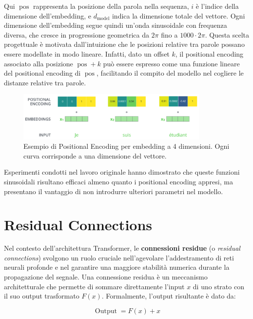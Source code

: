 Qui $\operatorname{pos}$ rappresenta la posizione della parola nella sequenza, $i$ è l'indice della dimensione dell'embedding, e $d_{\operatorname{model}}$ indica la dimensione totale del vettore. Ogni dimensione dell’embedding segue quindi un’onda sinusoidale con frequenza diversa, che cresce in progressione geometrica da $2\pi$ fino a $1000 \cdot 2\pi$. Questa scelta progettuale è motivata dall’intuizione che le posizioni relative tra parole possano essere modellate in modo lineare. Infatti, dato un offset $k$, il positional encoding associato alla posizione $\operatorname{pos} + k$ può essere espresso come una funzione lineare del positional encoding di $\operatorname{pos}$, facilitando il compito del modello nel cogliere le distanze relative tra parole.
\begin{figure}[hbtp]
    \centering
    \includegraphics[width=0.85\textwidth]{figure/PositionalEncoding}
    \caption{Esempio di Positional Encoding per embedding a 4 dimensioni. Ogni curva corrisponde a una dimensione del vettore.}
    \label{fig:posEncoding}
\end{figure}
Esperimenti condotti nel lavoro originale hanno dimostrato che queste funzioni sinusoidali risultano efficaci almeno quanto i positional encoding appresi, ma presentano il vantaggio di non introdurre ulteriori parametri nel modello.

\section{Residual Connections}

Nel contesto dell’architettura Transformer, le \textbf{connessioni residue} (o \textit{residual connections}) svolgono un ruolo cruciale nell’agevolare l’addestramento di reti neurali profonde e nel garantire una maggiore stabilità numerica durante la propagazione del segnale. Una connessione residua è un meccanismo architetturale che permette di sommare direttamente l’input $x$ di uno strato con il suo output trasformato $F(x)$. Formalmente, l’output risultante è dato da:

\begin{equation}
    \operatorname{Output} = F(x) + x
\end{equation}

